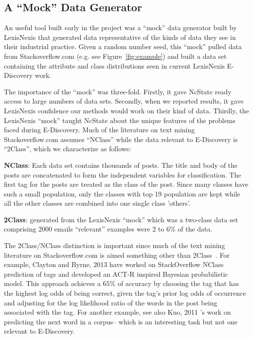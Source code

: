 \documentclass{sig-alternate-05-2015}
\newcommand{\bi}{\begin{itemize*}}
\newcommand{\ei}{\end{itemize*}}
\newcommand{\fig}[1]{Figure~\ref{fig:#1}}
\theoremstyle{break}
\begin{document}
\subsection{A ``Mock'' Data Generator}
An useful   tool built  early in the project was  a ``mock'' data generator  built by LexisNexis that generated   data  
representative of the kinds of data they see in their industrial practice. 
Given a random number seed, this ``mock'' pulled
data from Stackoverflow.com (e.g. see \fig{example})
and built
a data set  containing the attribute
and class distributions seen in current LexisNexis E-Discovery work.

The importance of the ``mock'' was three-fold. Firstly, it gave NcState ready access to large
numbers of data sets. Secondly, when we reported results, it gave LexisNexis confidence
our methods would work on their kind of data.
Thirdly, the LexisNexis ``mock'' taught  NcState about the unique features of
the problems faced during E-Discovery.
Much of the literature on text mining Stackoverflow.com
assumes ``NClass'' while the data relevant to E-Discovery
is ``2Class'', which we characterize as follows:
\bi
\item
{\bf NClass}:   Each data set contains  thousands of posts. The title and body of the posts are concatenated to form the independent variables for classification. The first tag for the posts are treated as the class of the post. Since many classes have such a small population, only the classes with top 19 population are kept while all the other classes are combined into one single class 'others'.
\item
{\bf 2Class}: generated from the LexisNexis ``mock''
which was  a two-class data set comprising 2000 emails
 ``relevant''
examples were 2 to 6\% of the data.
\ei
The 2Class/NClass distinction is important since much of
the text mining literature on Stackoverflow.com is
aimed something other than 2Class~\cite{moharanatag,stanley2013predicting,kuo2011word}. For example, Clayton and Byrne, 2013 \cite{stanley2013predicting} have worked on StackOverflow NClass prediction of tags and developed an ACT-R inspired Bayesian probabilistic model. This approach achieves a $65\%$ of accuracy by choosing the tag that has the highest log odds of being correct, given the tag's prior log odds of occurrence and adjusting for the log likelihood ratio of the words in the post being associated with the tag.
For another example,  see also Kuo, 2011 \cite{kuo2011word}'s work on predicting the next word in a corpus-- which is an interesting
task but not one relevant to E-Discovery.
\end{document}
